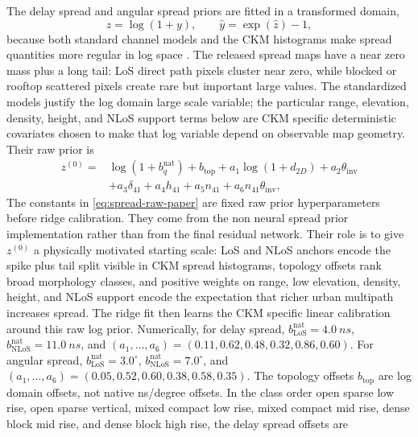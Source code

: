\documentclass[journal]{IEEEtran}
\begin{document}
The delay spread and angular spread priors are fitted in a transformed domain,
\begin{equation}
z=\log(1+y),
\qquad
\hat y=\exp(\hat z)-1,
\label{eq:spread-transform-paper}
\end{equation}
because both standard channel models and the CKM histograms make spread
quantities more regular in log space \cite{tr38901,winner2}. The released
spread maps have a near zero mass plus a long tail: LoS direct path pixels
cluster near zero, while blocked or rooftop scattered pixels create rare but
important large values. The standardized models justify the log domain
large scale variable; the particular range, elevation, density, height, and
NLoS support terms below are CKM specific deterministic covariates chosen to
make that log variable depend on observable map geometry. Their raw prior is
\begin{equation}
\begin{aligned}
z^{(0)}
={}&\log(1+b^{\mathrm{nat}}_q)
+b_{\mathrm{top}}
+a_1\log(1+d_{2D})+a_2\theta_{\mathrm{inv}} \\
&+a_3\delta_{41}+a_4h_{41}+a_5n_{41}
+a_6n_{41}\theta_{\mathrm{inv}},
\end{aligned}
\label{eq:spread-raw-paper}
\end{equation}
The constants in \eqref{eq:spread-raw-paper} are fixed raw prior
hyperparameters before ridge calibration. They come from the non neural spread
prior implementation rather than from the final residual network. Their role is
to give \(z^{(0)}\) a physically motivated starting scale: LoS and NLoS anchors
encode the spike plus tail split visible in CKM spread histograms, topology
offsets rank broad morphology classes, and positive weights on range, low
elevation, density, height, and NLoS support encode the expectation that richer
urban multipath increases spread. The ridge fit then learns the CKM specific
linear calibration around this raw log prior. Numerically, for delay spread,
\(b_{\mathrm{LoS}}^{\mathrm{nat}}=\SI{4.0}{ns}\),
\(b_{\mathrm{NLoS}}^{\mathrm{nat}}=\SI{11.0}{ns}\), and
\((a_1,\ldots,a_6)=(0.11,0.62,0.48,0.32,0.86,0.60)\). For angular spread,
\(b_{\mathrm{LoS}}^{\mathrm{nat}}=3.0^\circ\),
\(b_{\mathrm{NLoS}}^{\mathrm{nat}}=7.0^\circ\), and
\((a_1,\ldots,a_6)=(0.05,0.52,0.60,0.38,0.58,0.35)\). The topology offsets
\(b_{\mathrm{top}}\) are log domain offsets, not native ns/degree offsets. In
the class order open sparse low rise, open sparse vertical,
mixed compact low rise, mixed compact mid rise, dense block mid rise, and
dense block high rise, the delay spread offsets are
\end{document}
